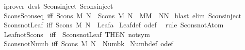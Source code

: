 \begin{isabellebody}
%
\isadelimproof
%
\endisadelimproof
%
\isatagproof
{}\isamarkupfalse%
\ {\isacharparenleft}iprover\ dest{\isacharcolon}\ Scons{\isacharunderscore}inject{}\ Scons{\isacharunderscore}inject{}{\isacharparenright}%
\endisatagproof
{\isafoldproof}%
%
\isadelimproof
\isanewline
%
\endisadelimproof
\isanewline
{}\isamarkupfalse%
\ Scons{\isacharunderscore}Scons{\isacharunderscore}eq\ {\isacharbrackleft}iff{\isacharbrackright}{\isacharcolon}\ {\isachardoublequoteopen}{\isacharparenleft}Scons\ M\ N\ {\isacharequal}\ Scons\ M{\isacharprime}\ N{\isacharprime}{\isacharparenright}\ {\isacharequal}\ {\isacharparenleft}M{\isacharequal}M{\isacharprime}\ {\isasymand}\ N{\isacharequal}N{\isacharprime}{\isacharparenright}{\isachardoublequoteclose}\isanewline
%
\isadelimproof
%
\endisadelimproof
%
\isatagproof
{}\isamarkupfalse%
\ {\isacharparenleft}blast\ elim{\isacharbang}{\isacharcolon}\ Scons{\isacharunderscore}inject{\isacharparenright}%
\endisatagproof
{\isafoldproof}%
%
\isadelimproof
\isanewline
%
\endisadelimproof
\isanewline
\isanewline
\isanewline
\isanewline
\isanewline
{}\isamarkupfalse%
\ Scons{\isacharunderscore}not{\isacharunderscore}Leaf\ {\isacharbrackleft}iff{\isacharbrackright}{\isacharcolon}\ {\isachardoublequoteopen}Scons\ M\ N\ {\isasymnoteq}\ Leaf{\isacharparenleft}a{\isacharparenright}{\isachardoublequoteclose}\isanewline
%
\isadelimproof
%
\endisadelimproof
%
\isatagproof
{}\isamarkupfalse%
\ Leaf{\isacharunderscore}def\ o{\isacharunderscore}def\ \isamarkupfalse%
\ {\isacharparenleft}rule\ Scons{\isacharunderscore}not{\isacharunderscore}Atom{\isacharparenright}%
\endisatagproof
{\isafoldproof}%
%
\isadelimproof
\isanewline
%
\endisadelimproof
\isanewline
{}\isamarkupfalse%
\ Leaf{\isacharunderscore}not{\isacharunderscore}Scons\ \ {\isacharbrackleft}iff{\isacharbrackright}\ {\isacharequal}\ Scons{\isacharunderscore}not{\isacharunderscore}Leaf\ {\isacharbrackleft}THEN\ not{\isacharunderscore}sym{\isacharbrackright}\isanewline
\isanewline
\isanewline
\isanewline
{}\isamarkupfalse%
\ Scons{\isacharunderscore}not{\isacharunderscore}Numb\ {\isacharbrackleft}iff{\isacharbrackright}{\isacharcolon}\ {\isachardoublequoteopen}Scons\ M\ N\ {\isasymnoteq}\ Numb{\isacharparenleft}k{\isacharparenright}{\isachardoublequoteclose}\isanewline
%
\isadelimproof
%
\endisadelimproof
%
\isatagproof
{}\isamarkupfalse%
\ Numb{\isacharunderscore}def\ o{\isacharunderscore}def\ \isamarkupfalse%

\end{isabellebody}
